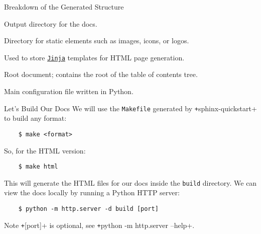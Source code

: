 {
\begin{frame}[fragile]{Breakdown of the Generated Structure}
  \begin{description}[labelwidth=\widthof{\faFolderOpen \texttt{\_templates}}]
    \setlength{\itemindent}{-4em}
    \item [\textcolor{dircolor}{\faFolderOpen} \texttt{build}:] Output directory for the docs.
    \item [\textcolor{dircolor}{\faFolderOpen} \texttt{\_static}:] Directory for static elements such as images, icons, or logos.
    \item [\textcolor{dircolor}{\faFolderOpen} \texttt{\_templates}:] Used to store \href{https://jinja.palletsprojects.com/en/stable/}{\texttt{Jinja}}
      templates for HTML page generation. %
    \item [\textcolor{vertexDarkRed}{\faFile*} \texttt{index.rst}:] Root document; contains the root of the table of contents tree.
    \item [\textcolor{vertexDarkRed}{\faPython} \texttt{conf.py}:] Main configuration file written in Python.
  \end{description}
\end{frame}
}

\begin{frame}[fragile]{Let's Build Our Docs}
  We will use the \texttt{Makefile} generated by \texttt+sphinx-quickstart+ to build any format:
  \begin{verbatim}
    $ make <format>
  \end{verbatim}
  So, for the HTML version:
  \begin{verbatim}
    $ make html
  \end{verbatim}
  This will generate the HTML files for our docs inside the \texttt{build} directory.
  We can view the docs locally by running a Python HTTP server:
  \begin{verbatim}
    $ python -m http.server -d build [port]
  \end{verbatim}

  \begin{block}{Note}
    \texttt+[port]+ is optional, see \texttt+python -m http.server --help+.
  \end{block}
\end{frame}


